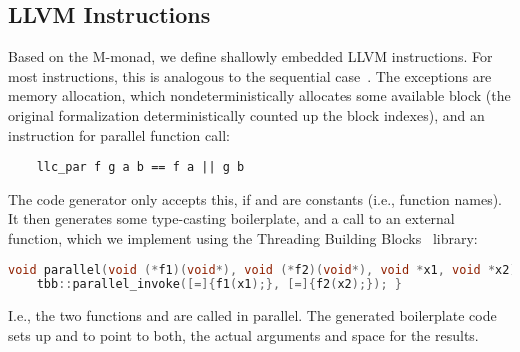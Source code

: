 \documentclass[a4paper,UKenglish,cleveref, autoref, thm-restate]{lipics-v2021}
\begin{document}
  \subsection{LLVM Instructions}
  Based on the M-monad, we define shallowly embedded LLVM instructions. For most instructions,
  this is analogous to the sequential case~\cite{La19-llvm}.
  The exceptions are memory allocation, which nondeterministically allocates some available
  block (the original formalization deterministically counted up the block indexes), and an instruction for parallel
  function call:
  \begin{lstlisting}
    llc_par f g a b == f a || g b
  \end{lstlisting}
  The code generator only accepts this, if  and  are constants (i.e., function names).
  It then generates some type-casting boilerplate, and a call to an external
   function, which we implement using the Threading Building Blocks~\cite{TBB} library:
  \begin{lstlisting}[language=C++]
  void parallel(void (*f1)(void*), void (*f2)(void*), void *x1, void *x2) {
    tbb::parallel_invoke([=]{f1(x1);}, [=]{f2(x2);}); }
  \end{lstlisting}
  I.e., the two functions  and  are called in parallel. The generated boilerplate code sets up  and  to point to both, the actual arguments and space for the results.
\end{document}
